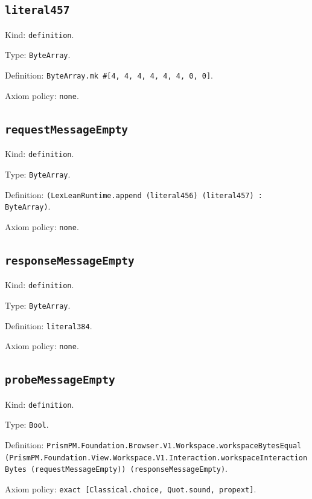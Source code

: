 \documentclass[11pt]{article}
\begin{document}
\subsection*{\texttt{literal457}}
\noindent Kind: \texttt{definition}.\par
\noindent Type: \texttt{ByteArray}.\par
\noindent Definition: \texttt{ByteArray.mk \#[4, 4, 4, 4, 4, 4, 0, 0]}.\par
\noindent Axiom policy: \texttt{none}.\par
\subsection*{\texttt{requestMessageEmpty}}
\noindent Kind: \texttt{definition}.\par
\noindent Type: \texttt{ByteArray}.\par
\noindent Definition: \texttt{(LexLeanRuntime.append (literal456) (literal457) : ByteArray)}.\par
\noindent Axiom policy: \texttt{none}.\par
\subsection*{\texttt{responseMessageEmpty}}
\noindent Kind: \texttt{definition}.\par
\noindent Type: \texttt{ByteArray}.\par
\noindent Definition: \texttt{literal384}.\par
\noindent Axiom policy: \texttt{none}.\par
\subsection*{\texttt{probeMessageEmpty}}
\noindent Kind: \texttt{definition}.\par
\noindent Type: \texttt{Bool}.\par
\noindent Definition: \texttt{PrismPM.Foundation.Browser.V1.Workspace.workspaceBytesEqual (PrismPM.Foundation.View.Workspace.V1.Interaction.workspaceInteractionBytes (requestMessageEmpty)) (responseMessageEmpty)}.\par
\noindent Axiom policy: \texttt{exact [Classical.choice, Quot.sound, propext]}.\par
\end{document}

